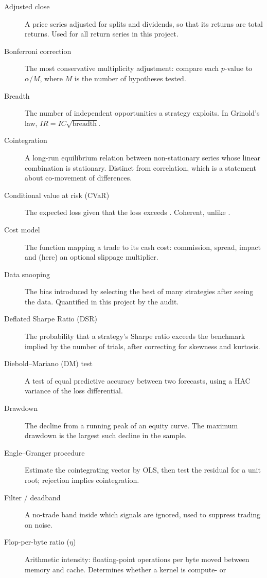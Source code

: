 \begin{description}
  \item[Adjusted close] A price series adjusted for splits and dividends, so that its
    returns are total returns. Used for all return series in this project.
  \item[Bonferroni correction] The most conservative multiplicity adjustment: compare each
    $p$-value to $\alpha/M$, where $M$ is the number of hypotheses tested.
  \item[Breadth] The number of independent opportunities a strategy exploits. In
    Grinold's law, $IR=IC\sqrt{\text{breadth}}$.
  \item[Cointegration] A long-run equilibrium relation between non-stationary series whose
    linear combination is stationary. Distinct from correlation, which is a statement about
    co-movement of differences.
  \item[Conditional value at risk (CVaR)] The expected loss given that the loss exceeds
    . Coherent, unlike .
  \item[Cost model] The function mapping a trade to its cash cost: commission, spread,
    impact and (here) an optional slippage multiplier.
  \item[Data snooping] The bias introduced by selecting the best of many strategies after
    seeing the data. Quantified in this project by the  audit.
  \item[Deflated Sharpe Ratio (DSR)] The probability that a strategy's Sharpe ratio exceeds
    the benchmark implied by the number of trials, after correcting for skewness and
    kurtosis.
  \item[Diebold--Mariano (DM) test] A test of equal predictive accuracy between two
    forecasts, using a HAC variance of the loss differential.
  \item[Drawdown] The decline from a running peak of an equity curve. The maximum drawdown
    is the largest such decline in the sample.
  \item[Engle--Granger procedure] Estimate the cointegrating vector by OLS, then test the
    residual for a unit root; rejection implies cointegration.
  \item[Filter / deadband] A no-trade band inside which signals are ignored, used to
    suppress trading on noise.
  \item[Flop-per-byte ratio ($\eta$)] Arithmetic intensity: floating-point operations per
    byte moved between memory and cache. Determines whether a kernel is compute- or

\end{description}
